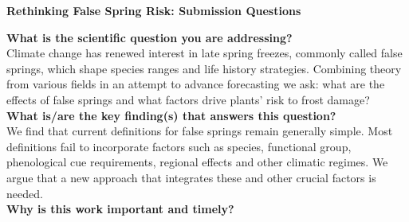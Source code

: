 \documentclass{article}\usepackage[]{graphicx}\usepackage[]{color}
\begin{document}
\nobibliography*
\noindent \textbf{\Large{Rethinking False Spring Risk: Submission Questions}}\\
\vspace{3ex}

\noindent \textbf{What is the scientific question you are addressing?} \\

\noindent Climate change has renewed interest in late spring freezes, commonly called false springs, which shape species ranges and life history strategies. Combining theory from various fields in an attempt to advance forecasting we ask: what are the effects of false springs and what factors drive plants' risk to frost damage? \\ %


\noindent \textbf{What is/are the key finding(s) that answers this question?} \\

\noindent We find that current definitions for false springs remain generally simple. Most definitions fail to incorporate factors such as species, functional group, phenological cue requirements, regional effects and other climatic regimes. We argue that a new approach that integrates these and other crucial factors is needed. \\ %

\noindent \textbf{Why is this work important and timely?}\\

\end{document}
